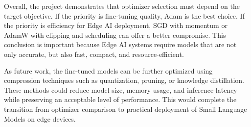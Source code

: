 \vspace*{0.15cm}

Overall, the project demonstrates that optimizer selection must depend on the
target objective. If the priority is fine-tuning quality, Adam is the best
choice. If the priority is efficiency for Edge AI deployment, SGD with momentum or
AdamW with clipping and scheduling can offer a better compromise. This conclusion
is important because Edge AI systems require models that are not only accurate,
but also fast, compact, and resource-efficient.

\vspace*{0.15cm}

As future work, the fine-tuned models can be further optimized using compression
techniques such as quantization, pruning, or knowledge distillation. These methods
could reduce model size, memory usage, and inference latency while preserving an
acceptable level of performance. This would complete the transition from
optimizer comparison to practical deployment of Small Language Models on edge
devices.
